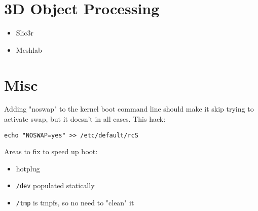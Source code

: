 \section{3D Object Processing}

\begin{itemize}
  \item{Slic3r}
  \item{Meshlab}
\end{itemize}

\section{Misc}

Adding "noswap" to the kernel boot command line should make it skip trying
to activate swap, but it doesn't in all cases. This hack:

\verb|echo "NOSWAP=yes" >> /etc/default/rcS|

Areas to fix to speed up boot:

\begin{itemize}
  \item{hotplug}
  \item{\verb|/dev| populated statically}
  \item{\verb|/tmp| is tmpfs, so no need to "clean" it}
\end{itemize}

